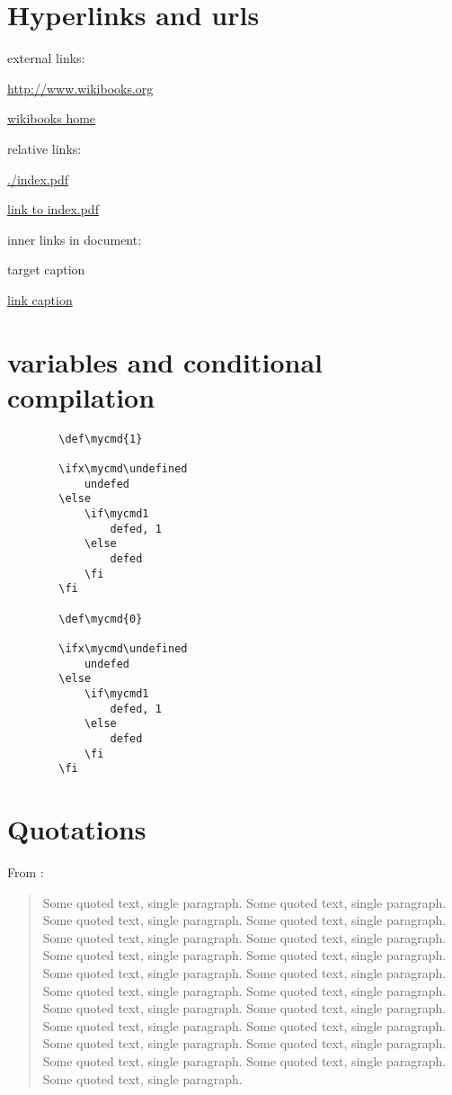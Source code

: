 \documentclass[12pt]{article}
\begin{document}
\section{Hyperlinks and urls}\label{hyperlinks-urls}

    external links:

    \url{http://www.wikibooks.org}

    \href{http://www.wikibooks.org}{wikibooks home}

    relative links:

    \url{./index.pdf}

    \href{./index.pdf}{link to index.pdf}

    inner links in document:

    \hypertarget{label}{target caption}

    \hyperlink{label}{link caption}

    \section{variables and conditional compilation}

    \begin{lstlisting}
        \def\mycmd{1}

        \ifx\mycmd\undefined
            undefed
        \else
            \if\mycmd1
                defed, 1
            \else
                defed
            \fi
        \fi

        \def\mycmd{0}

        \ifx\mycmd\undefined
            undefed
        \else
            \if\mycmd1
                defed, 1
            \else
                defed
            \fi
        \fi
    \end{lstlisting}

\section{Quotations}\label{quotations}

    From \cite{Aa00}:
    \begin{quote}
    Some quoted text, single paragraph. Some quoted text, single paragraph. Some quoted text, single paragraph.
    Some quoted text, single paragraph. Some quoted text, single paragraph. Some quoted text, single paragraph.
    Some quoted text, single paragraph. Some quoted text, single paragraph. Some quoted text, single paragraph.
    Some quoted text, single paragraph. Some quoted text, single paragraph. Some quoted text, single paragraph.
    Some quoted text, single paragraph. Some quoted text, single paragraph. Some quoted text, single paragraph.
    Some quoted text, single paragraph. Some quoted text, single paragraph. Some quoted text, single paragraph.
    Some quoted text, single paragraph. Some quoted text, single paragraph. Some quoted text, single paragraph.
    \end{quote}
\end{document}
